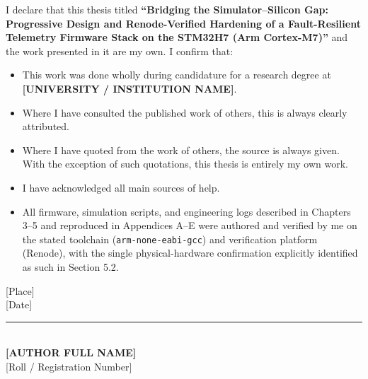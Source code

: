 
I declare that this thesis titled \textbf{``Bridging the Simulator--Silicon Gap: Progressive Design and Renode-Verified Hardening of a Fault-Resilient Telemetry Firmware Stack on the STM32H7 (Arm Cortex-M7)''} and the work presented in it are my own. I confirm that:

\begin{itemize}
\item This work was done wholly during candidature for a research degree at \textbf{[UNIVERSITY / INSTITUTION NAME]}.
\item Where I have consulted the published work of others, this is always clearly attributed.
\item Where I have quoted from the work of others, the source is always given. With the exception of such quotations, this thesis is entirely my own work.
\item I have acknowledged all main sources of help.
\item All firmware, simulation scripts, and engineering logs described in Chapters 3--5 and reproduced in Appendices A--E were authored and verified by me on the stated toolchain (\texttt{arm-none-eabi-gcc}) and verification platform (Renode), with the single physical-hardware confirmation explicitly identified as such in Section 5.2.
\end{itemize}

\vspace{2.0cm}
\noindent
\begin{minipage}[t]{0.45\textwidth}
[Place] \\{}
[Date]
\end{minipage}%
\begin{minipage}[t]{0.45\textwidth}
\raggedleft
\rule{6cm}{0.4pt}\\
\textbf{[AUTHOR FULL NAME]} \\{}
[Roll / Registration Number]
\end{minipage}
